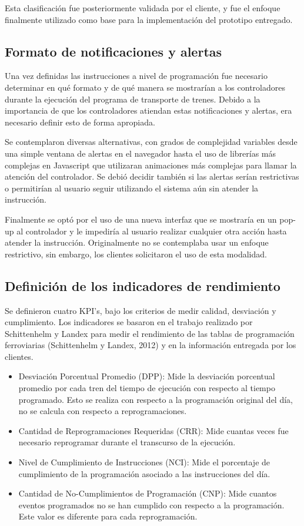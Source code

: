 \documentclass[oneside,12pt, letterpaper, titlepage]{book}
\begin{document}
Esta clasificación fue posteriormente validada por el cliente, y fue el enfoque finalmente utilizado como base para la implementación del prototipo entregado.

\subsection{Formato de notificaciones y alertas}
Una vez definidas las instrucciones a nivel de programación fue necesario determinar en qué formato y de qué manera se mostrarían a los controladores durante la ejecución del programa de transporte de trenes. Debido a la importancia de que los controladores atiendan estas notificaciones y alertas, era necesario definir esto de forma apropiada.

Se contemplaron diversas alternativas, con grados de complejidad variables desde una simple ventana de alertas en el navegador hasta el uso de librerías más complejas en Javascript que utilizaran animaciones más complejas para llamar la atención del controlador. Se debió decidir también si las alertas serían restrictivas o permitirían al usuario seguir utilizando el sistema aún sin atender la instrucción. 

Finalmente se optó por el uso de una nueva interfaz que se mostraría en un pop-up al controlador y le impediría al usuario realizar cualquier otra acción hasta atender la instrucción. Originalmente no se contemplaba usar un enfoque restrictivo, sin embargo, los clientes solicitaron el uso de esta modalidad.

\subsection{Definición de los indicadores de rendimiento}
Se definieron cuatro KPI’s, bajo los criterios de medir calidad, desviación y cumplimiento. Los indicadores se basaron en el trabajo realizado por Schittenhelm y Landex para medir el rendimiento de las tablas de programación ferroviarias (Schittenhelm y Landex, 2012) y en la información entregada por los clientes.

\begin{itemize}
\item Desviación Porcentual Promedio (DPP): Mide la desviación porcentual promedio por cada tren del tiempo de ejecución con respecto al tiempo programado. Esto se realiza con respecto a la programación original del día, no se calcula con respecto a reprogramaciones.
\item Cantidad de Reprogramaciones Requeridas (CRR): Mide cuantas veces fue necesario reprogramar durante el transcurso de la ejecución.
\item Nivel de Cumplimiento de Instrucciones (NCI): Mide el porcentaje de cumplimiento de la programación asociado a las instrucciones del día.
\item Cantidad de No-Cumplimientos de Programación (CNP): Mide cuantos eventos programados no se han cumplido con respecto a la programación. Este valor es diferente para cada reprogramación.
\end{itemize}
\end{document}

